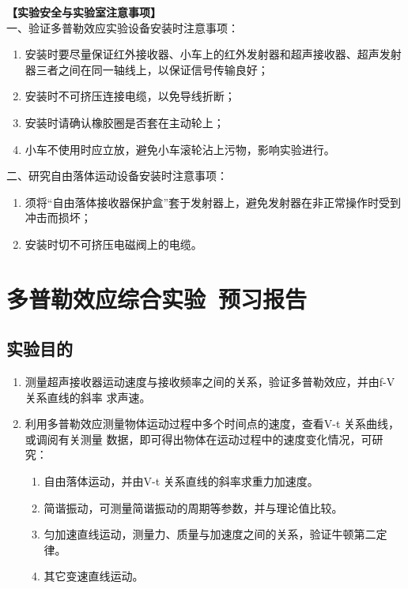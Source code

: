 \documentclass[dvipsnames, svgnames,a4paper,11pt]{article}
\begin{document}
{\textbf{【实验安全与实验室注意事项】}\\
一、验证多普勒效应实验设备安装时注意事项：
\begin{enumerate}
	\item 安装时要尽量保证红外接收器、小车上的红外发射器和超声接收器、超声发射器三者之间在同一轴线上，以保证信号传输良好；
	\item 安装时不可挤压连接电缆，以免导线折断；
	\item 安装时请确认橡胶圈是否套在主动轮上；
	\item 小车不使用时应立放，避免小车滚轮沾上污物，影响实验进行。
\end{enumerate}}
\noindent 二、研究自由落体运动设备安装时注意事项：
\begin{enumerate}
    \item 须将“自由落体接收器保护盒”套于发射器上，避免发射器在非正常操作时受到冲击而损坏；
    \item 安装时切不可挤压电磁阀上的电缆。
\end{enumerate}

\clearpage
\tableofcontents
\clearpage

\setcounter{section}{0}
\section{多普勒效应综合实验\ \textbf{预习报告}}
	
\subsection{实验目的}
\begin{enumerate}
    \item 测量超声接收器运动速度与接收频率之间的关系，验证多普勒效应，并由f-V 关系直线的斜率
	求声速。
	\item 利用多普勒效应测量物体运动过程中多个时间点的速度，查看V-t 关系曲线，或调阅有关测量
	数据，即可得出物体在运动过程中的速度变化情况，可研究：
	\begin{enumerate}[1)]
		\item 自由落体运动，并由V-t 关系直线的斜率求重力加速度。
		\item 简谐振动，可测量简谐振动的周期等参数，并与理论值比较。
		\item 匀加速直线运动，测量力、质量与加速度之间的关系，验证牛顿第二定律。
		\item 其它变速直线运动。
	\end{enumerate}
\end{enumerate}
\end{document}
